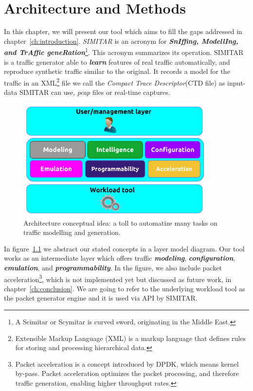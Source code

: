 \chapter{Architecture and Methods}\label{ch:architecture}

In this chapter, we will present our tool which aims to fill the gaps addressed in chapter~\ref{ch:introduction}. \textit{SIMITAR} is an acronym for \textbf{\textit{SnIffing, ModellIng, and TrAffic geneRation}}\footnote{A Scimitar or Scymitar is curved sword, originating in the Middle East\cite{scymitar-sword}.}. This acronym summarizes its operation.
SIMITAR is a traffic generator able to \textbf{\textit{learn}} features of real traffic automatically, and reproduce synthetic traffic similar to the original. It records a model for the traffic in an \acrfull{XML}\footnote{Extensible Markup Language (XML) is a markup language that defines rules for storing and processing hierarchical data\cite{web-xml}.} file we call the \textit{Compact Trace Descriptor}(CTD file) as input-data SIMITAR can use, \textit{pcap} files or real-time captures. 

\begin{figure}[ht!]
    \centering
    \includegraphics[height=2.4in]{figures/ch1/layer-diagram}
    \caption{ Architecture conceptual idea: a toll to automatize many tasks on traffic modelling and generation.}
    \label{fig:layer-diagram}
\end{figure}

In figure~\ref{fig:layer-diagram} we abstract our stated concepts in a layer model diagram. Our tool works as an intermediate layer which offers traffic \textbf{\textit{modeling}}, \textbf{\textit{configuration}}, \textbf{\textit{emulation}}, and \textbf{\textit{programmability}}. In the figure, we also include packet acceleration\footnote{Packet acceleration is a concept introduced by DPDK\cite{web-dpdk}, which means kernel by-pass. Packet acceleration optimizes the packet processing, and therefore traffic generation, enabling higher throughput rates.}, which is not implemented yet but discussed as future work, in chapter~\ref{ch:conclusion}.  We are going to refer to the underlying workload tool as the packet generator engine and it is used via API by SIMITAR. 

